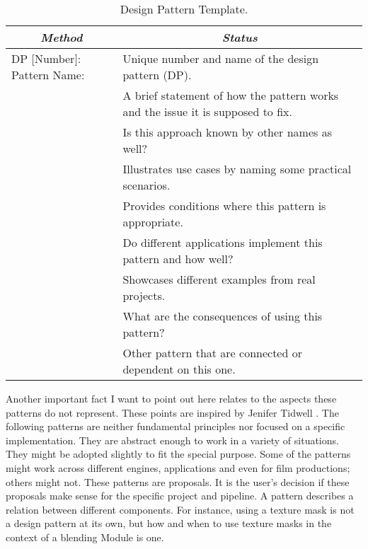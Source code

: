 \begin{table}
	\centering\small 
	\begin{tabular}{|p{}|p{}|}
		\hline
		\multicolumn{1}{|c}{\emph{Method}} &
		\multicolumn{1}{|c|}{\emph{Status}} \\
		\hline\hline
		
		DP [Number]: Pattern Name:    &  Unique number and name of the design pattern (DP).                                                                   \\ \hline
		\patIntent         & A brief statement of how the pattern works and the issue it is supposed to fix. \\ \hline
		\patAlsoKnownAs    & Is this approach known by other names as well?                                  \\ \hline
		\patMotivation     & Illustrates use cases by naming some practical scenarios.                       \\ \hline
		\patApplicability  & Provides conditions where this pattern is appropriate.                          \\ \hline
		\patImplementation & Do different applications implement this pattern and how well?                  \\ \hline
		\patExamples       & Showcases different examples from real projects.                                \\ \hline
		\patConsequences   & What are the consequences of using this pattern?                                \\ \hline
		\patRelations      & Other pattern that are connected or dependent on this one.  \\ \hline 

	\end{tabular}
	\caption{Design Pattern Template.}
	\label{tab:designPatternStructure}
\end{table}


Another important fact I want to point out here relates to the aspects these patterns do not represent. These points are inspired by Jenifer Tidwell \cite[p.\,42--46]{tidwell2010designing}. The following patterns are neither fundamental principles nor focused on a specific implementation. They are abstract enough to work in a variety of situations. They might be adopted slightly to fit the special purpose. Some of the patterns might work across different engines, applications and even for film productions;  others might not. These patterns are proposals. It is the user's decision if these proposals make sense for the specific project and pipeline. A pattern describes a relation between different components. For instance, using a texture mask is not a design pattern at its own, but how and when to use texture masks in the context of a blending Module is one.  


